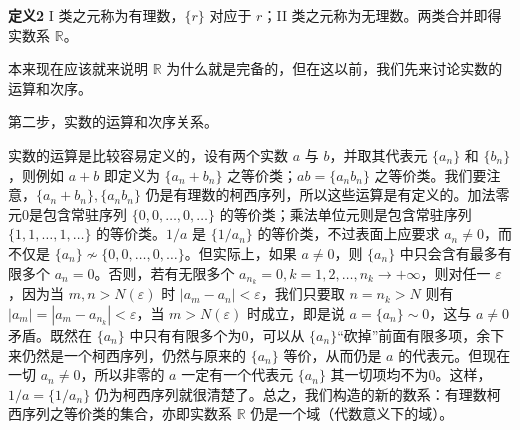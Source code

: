 \noindent\textbf{定义2}\quad
I 类之元称为有理数，$\{r\}$ 对应于 $r$；II 类之元称为无理数。两类合并即得实数系 $\mathbb R$。

本来现在应该就来说明 $\mathbb R$ 为什么就是完备的，但在这以前，我们先来讨论实数的运算和次序。

第二步，实数的运算和次序关系。

实数的运算是比较容易定义的，设有两个实数 $a$ 与 $b$，并取其代表元 $\{a_n\}$ 和 $\{b_n\}$，则例如 $a+b$ 即定义为 $\{a_n+b_n\}$ 之等价类；$ab=\{a_nb_n\}$ 之等价类。我们要注意，$\{a_n+b_n\},\{a_nb_n\}$ 仍是有理数的柯西序列，所以这些运算是有定义的。加法零元0是包含常驻序列 $\{0,0,\ldots,0,\ldots\}$ 的等价类；乘法单位元则是包含常驻序列 $\{1,1,\ldots,1,\ldots\}$ 的等价类。$1/a$ 是 $\{1/a_n\}$ 的等价类，不过表面上应要求 $a_n\ne0$，而不仅是 $\{a_n\}\not\sim\{0,0,\ldots,0,\ldots\}$。但实际上，如果 $a\ne0$，则 $\{a_n\}$ 中只会含有最多有限多个 $a_n=0$。否则，若有无限多个 $a_{n_k}=0,k=1,2,\ldots,n_k\to+\infty$，则对任一 $\varepsilon$，因为当 $m,n>N(\varepsilon)$ 时 $|a_m-a_n|<\varepsilon$，我们只要取 $n=n_k>N$ 则有 $|a_m|=|a_m-a_{n_k}|<\varepsilon$，当 $m>N(\varepsilon)$ 时成立，即是说 $a=\{a_n\}\sim0$，这与 $a\ne0$ 矛盾。既然在 $\{a_n\}$ 中只有有限多个为0，可以从 $\{a_n\}$“砍掉”前面有限多项，余下来仍然是一个柯西序列，仍然与原来的 $\{a_n\}$ 等价，从而仍是 $a$ 的代表元。但现在一切 $a_n\ne0$，所以非零的 $a$ 一定有一个代表元 $\{a_n\}$ 其一切项均不为0。这样，$1/a=\{1/a_n\}$ 仍为柯西序列就很清楚了。总之，我们构造的新的数系：有理数柯西序列之等价类的集合，亦即实数系 $\mathbb R$ 仍是一个域（代数意义下的域）。

